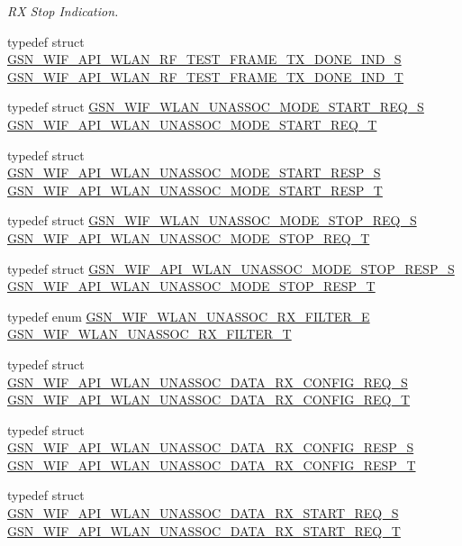 \begin{DoxyCompactItemize}
\begin{DoxyCompactList}\small\item\em RX Stop Indication. \end{DoxyCompactList}\item 
typedef struct \hyperlink{a00305}{GSN\_\-WIF\_\-API\_\-WLAN\_\-RF\_\-TEST\_\-FRAME\_\-TX\_\-DONE\_\-IND\_\-S} \hyperlink{a00677_gab973e6ccfee43f5c404b5e6cea8d6e73}{GSN\_\-WIF\_\-API\_\-WLAN\_\-RF\_\-TEST\_\-FRAME\_\-TX\_\-DONE\_\-IND\_\-T}
\item 
typedef struct \hyperlink{a00412}{GSN\_\-WIF\_\-WLAN\_\-UNASSOC\_\-MODE\_\-START\_\-REQ\_\-S} \hyperlink{a00677_ga848e3ca7a503435832991132fed9c32a}{GSN\_\-WIF\_\-API\_\-WLAN\_\-UNASSOC\_\-MODE\_\-START\_\-REQ\_\-T}
\item 
typedef struct \hyperlink{a00316}{GSN\_\-WIF\_\-API\_\-WLAN\_\-UNASSOC\_\-MODE\_\-START\_\-RESP\_\-S} \hyperlink{a00677_gaa302516a0b32337d991a88c35c71c5cf}{GSN\_\-WIF\_\-API\_\-WLAN\_\-UNASSOC\_\-MODE\_\-START\_\-RESP\_\-T}
\item 
typedef struct \hyperlink{a00413}{GSN\_\-WIF\_\-WLAN\_\-UNASSOC\_\-MODE\_\-STOP\_\-REQ\_\-S} \hyperlink{a00677_ga46d9bd5f7cc8d81cf0ada9306373c3ee}{GSN\_\-WIF\_\-API\_\-WLAN\_\-UNASSOC\_\-MODE\_\-STOP\_\-REQ\_\-T}
\item 
typedef struct \hyperlink{a00317}{GSN\_\-WIF\_\-API\_\-WLAN\_\-UNASSOC\_\-MODE\_\-STOP\_\-RESP\_\-S} \hyperlink{a00677_ga2b01fa07922ed26ce73e38810a71c9ed}{GSN\_\-WIF\_\-API\_\-WLAN\_\-UNASSOC\_\-MODE\_\-STOP\_\-RESP\_\-T}
\item 
typedef enum \hyperlink{a00677_gaca8dae165f1024726492234d64d1bb26}{GSN\_\-WIF\_\-WLAN\_\-UNASSOC\_\-RX\_\-FILTER\_\-E} \hyperlink{a00677_gafef4e43da9e6e7525cd681c38eb10fed}{GSN\_\-WIF\_\-WLAN\_\-UNASSOC\_\-RX\_\-FILTER\_\-T}
\item 
typedef struct \hyperlink{a00306}{GSN\_\-WIF\_\-API\_\-WLAN\_\-UNASSOC\_\-DATA\_\-RX\_\-CONFIG\_\-REQ\_\-S} \hyperlink{a00677_ga9f4de24aab16f8c36b6afc23f8b6a1d4}{GSN\_\-WIF\_\-API\_\-WLAN\_\-UNASSOC\_\-DATA\_\-RX\_\-CONFIG\_\-REQ\_\-T}
\item 
typedef struct \hyperlink{a00307}{GSN\_\-WIF\_\-API\_\-WLAN\_\-UNASSOC\_\-DATA\_\-RX\_\-CONFIG\_\-RESP\_\-S} \hyperlink{a00677_gac8a70ef25878e7678969099ed572c753}{GSN\_\-WIF\_\-API\_\-WLAN\_\-UNASSOC\_\-DATA\_\-RX\_\-CONFIG\_\-RESP\_\-T}
\item 
typedef struct \hyperlink{a00310}{GSN\_\-WIF\_\-API\_\-WLAN\_\-UNASSOC\_\-DATA\_\-RX\_\-START\_\-REQ\_\-S} \hyperlink{a00677_gaecdcd1967f8fbb0ceacd7c88b7e59947}{GSN\_\-WIF\_\-API\_\-WLAN\_\-UNASSOC\_\-DATA\_\-RX\_\-START\_\-REQ\_\-T}

\end{DoxyCompactItemize}
